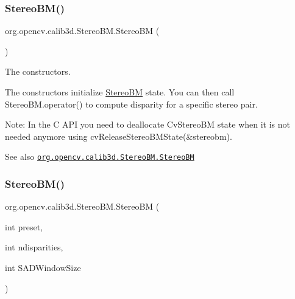 \mbox{\label{classorg_1_1opencv_1_1calib3d_1_1_stereo_b_m_acabf14c02b9ecb03e9e642284f0dfa81}} 
\subsubsection{\texorpdfstring{Stereo\+B\+M()}{StereoBM()}\hspace{0.1cm}{\footnotesize\ttfamily [2/4]}}
{\footnotesize\ttfamily org.\+opencv.\+calib3d.\+Stereo\+B\+M.\+Stereo\+BM (\begin{DoxyParamCaption}{ }\end{DoxyParamCaption})}

The constructors.

The constructors initialize {\ttfamily \mbox{\hyperlink{classorg_1_1opencv_1_1calib3d_1_1_stereo_b_m}{Stereo\+BM}}} state. You can then call {\ttfamily Stereo\+B\+M.\+operator()} to compute disparity for a specific stereo pair.

Note\+: In the C A\+PI you need to deallocate {\ttfamily Cv\+Stereo\+BM} state when it is not needed anymore using {\ttfamily cv\+Release\+Stereo\+B\+M\+State(\&stereobm)}.

\begin{DoxySeeAlso}{See also}
\href{http://docs.opencv.org/modules/calib3d/doc/camera_calibration_and_3d_reconstruction.html#stereobm-stereobm}{\tt org.\+opencv.\+calib3d.\+Stereo\+B\+M.\+Stereo\+BM} 
\end{DoxySeeAlso}
\mbox{\label{classorg_1_1opencv_1_1calib3d_1_1_stereo_b_m_af541fc22f204f29fa8a8a7585fb7d588}} 
\subsubsection{\texorpdfstring{Stereo\+B\+M()}{StereoBM()}\hspace{0.1cm}{\footnotesize\ttfamily [3/4]}}
{\footnotesize\ttfamily org.\+opencv.\+calib3d.\+Stereo\+B\+M.\+Stereo\+BM (\begin{DoxyParamCaption}\item[{int}]{preset,  }\item[{int}]{ndisparities,  }\item[{int}]{S\+A\+D\+Window\+Size }\end{DoxyParamCaption})}


